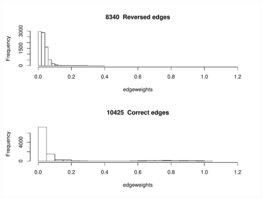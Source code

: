 \documentclass{article}\usepackage[]{graphicx}\usepackage[]{color}
\makeatletter
\def\maxwidth{ %
  \ifdim\Gin@nat@width>\linewidth
    \linewidth
  \else
    \Gin@nat@width
  \fi
}
\newenvironment{knitrout}{}{} %
\makeatother
\begin{document}
\begin{knitrout}
\color{fgcolor}

{\centering \includegraphics[width=\maxwidth]{figure/unnamed-chunk-2-1} 

}



\end{knitrout}
 

 
\end{document}
